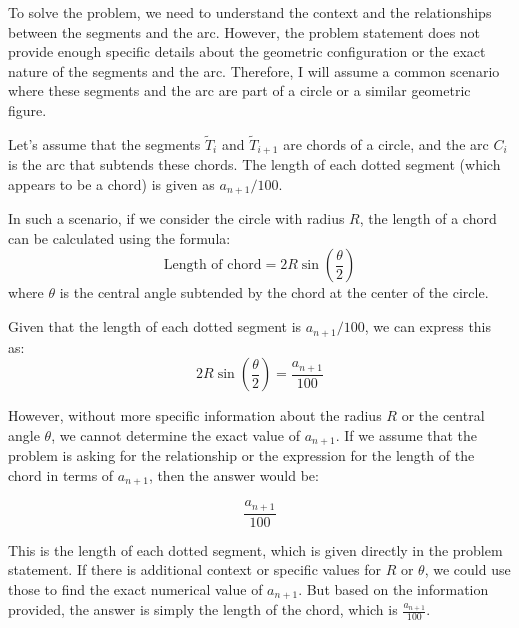 To solve the problem, we need to understand the context and the relationships between the segments and the arc. However, the problem statement does not provide enough specific details about the geometric configuration or the exact nature of the segments and the arc. Therefore, I will assume a common scenario where these segments and the arc are part of a circle or a similar geometric figure.

Let's assume that the segments \(\widetilde{T}_i\) and \(\widetilde{T}_{i+1}\) are chords of a circle, and the arc \(C_i\) is the arc that subtends these chords. The length of each dotted segment (which appears to be a chord) is given as \(a_{n+1}/100\).

In such a scenario, if we consider the circle with radius \(R\), the length of a chord can be calculated using the formula:
\[ \text{Length of chord} = 2R \sin\left(\frac{\theta}{2}\right) \]
where \(\theta\) is the central angle subtended by the chord at the center of the circle.

Given that the length of each dotted segment is \(a_{n+1}/100\), we can express this as:
\[ 2R \sin\left(\frac{\theta}{2}\right) = \frac{a_{n+1}}{100} \]

However, without more specific information about the radius \(R\) or the central angle \(\theta\), we cannot determine the exact value of \(a_{n+1}\). If we assume that the problem is asking for the relationship or the expression for the length of the chord in terms of \(a_{n+1}\), then the answer would be:

\[ \boxed{\frac{a_{n+1}}{100}} \]

This is the length of each dotted segment, which is given directly in the problem statement. If there is additional context or specific values for \(R\) or \(\theta\), we could use those to find the exact numerical value of \(a_{n+1}\). But based on the information provided, the answer is simply the length of the chord, which is \(\frac{a_{n+1}}{100}\).
